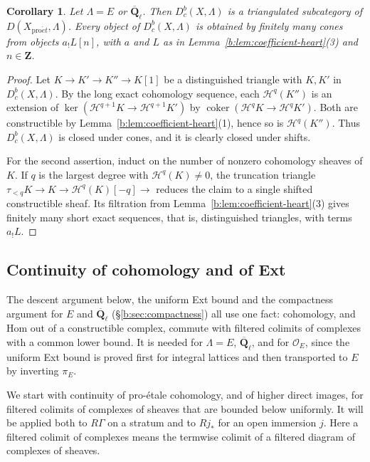 \documentclass[11pt,a4paper]{article}
\numberwithin{equation}{section}
\newtheorem{corollary}[theorem]{Corollary}
\theoremstyle{definition}
\theoremstyle{remark}
\newcommand{\D}{D}
\newcommand{\Dbc}{D^b_c}
\newcommand{\Qbar}{\overline{\mathbf Q}_\ell}
\newcommand{\proet}{\mathrm{pro}\acute{e}t}
\newcommand{\coker}{\operatorname{coker}}
\begin{document}
\begin{corollary}\label{b:lem:coefficient-heart-b}
Let $\Lambda=E$ or $\Qbar$. Then $\Dbc(X,\Lambda)$ is a triangulated
subcategory of $\D(X_{\proet},\Lambda)$. Every object of $\Dbc(X,\Lambda)$
is obtained by finitely many cones from objects $a_!L[n]$, with $a$ and
$L$ as in Lemma~\ref{b:lem:coefficient-heart}(3) and $n\in\mathbf Z$.
\end{corollary}
\begin{proof}
Let $K\to K'\to K''\to K[1]$ be a distinguished triangle with $K,K'$ in
$\Dbc(X,\Lambda)$. By the long exact cohomology sequence, each
$\mathcal H^q(K'')$ is an extension of
$\ker(\mathcal H^{q+1}K\to\mathcal H^{q+1}K')$ by
$\coker(\mathcal H^qK\to\mathcal H^qK')$. Both are constructible by
Lemma~\ref{b:lem:coefficient-heart}(1), hence so is $\mathcal H^q(K'')$.
Thus $\Dbc(X,\Lambda)$ is closed under cones, and it is clearly closed under
shifts.

For the second assertion, induct on the number of nonzero cohomology
sheaves of $K$. If $q$ is the largest degree with $\mathcal H^q(K)\ne0$,
the truncation triangle $\tau_{<q}K\to K\to\mathcal H^q(K)[-q]\to$ reduces
the claim to a single shifted constructible sheaf. Its filtration from
Lemma~\ref{b:lem:coefficient-heart}(3) gives finitely many short exact
sequences, that is, distinguished triangles, with terms $a_!L$.
\end{proof}

\subsection{Continuity of cohomology and of Ext}
\label{b:sec:ext-continuity}

The descent argument below, the uniform Ext bound and the compactness
argument for $E$ and $\Qbar$ (\S\ref{b:sec:compactness}) all use one
fact: cohomology, and Hom out of a constructible complex, commute with
filtered colimits of complexes with a common lower bound. It is needed
for $\Lambda=E$, $\Qbar$, and for $\mathcal O_E$, since the uniform Ext
bound is proved first for integral lattices and then transported to $E$
by inverting $\pi_E$.

We start with continuity of pro-\'etale cohomology, and of higher
direct images, for filtered colimits of complexes of sheaves that are
bounded below uniformly. It will be applied both to $R\Gamma$ on a
stratum and to $Rj_*$ for an open immersion $j$. Here a filtered colimit
of complexes means the termwise colimit of a filtered diagram of
complexes of sheaves.
\end{document}
